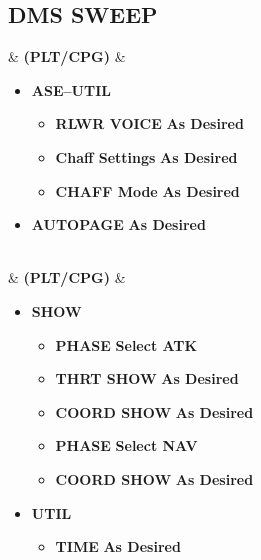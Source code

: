 \documentclass[fontHelvetica]{TechCheck}
\begin{document}
	\subsection{DMS SWEEP}
	\begin{listlongtable}
		\textbf{\textbullet} &  \textbf{(PLT/CPG)} &
		\begin{minipage}[t]{\linewidth}
			\begin{itemize}
				\item \textbf{ASE--UTIL}
				\begin{itemize}
					\item \textbf{RLWR VOICE} \dotfill \textbf{As Desired}
					\item \textbf{Chaff Settings} \dotfill \textbf{As Desired}
					\item \textbf{CHAFF Mode} \dotfill \textbf{As Desired}
				\end{itemize}
				\item \textbf{AUTOPAGE} \dotfill \textbf{As Desired}
			\end{itemize}
		\end{minipage} \\
		\midrule
		\textbf{\textbullet} &  \textbf{(PLT/CPG)} &
		\begin{minipage}[t]{\linewidth}
			\begin{itemize}
				\item \textbf{SHOW}
				\begin{itemize}
					\item \textbf{PHASE} \dotfill \textbf{Select ATK}
					\item \textbf{THRT SHOW} \dotfill \textbf{As Desired}
					\item \textbf{COORD SHOW} \dotfill \textbf{As Desired}
					\item \textbf{PHASE} \dotfill \textbf{Select NAV}
					\item \textbf{COORD SHOW} \dotfill \textbf{As Desired}
				\end{itemize}
				\item \textbf{UTIL}
				\begin{itemize}
					\item \textbf{TIME} \dotfill \textbf{As Desired}

\end{itemize}
\end{itemize}
\end{minipage}
\end{listlongtable}
\end{document}
